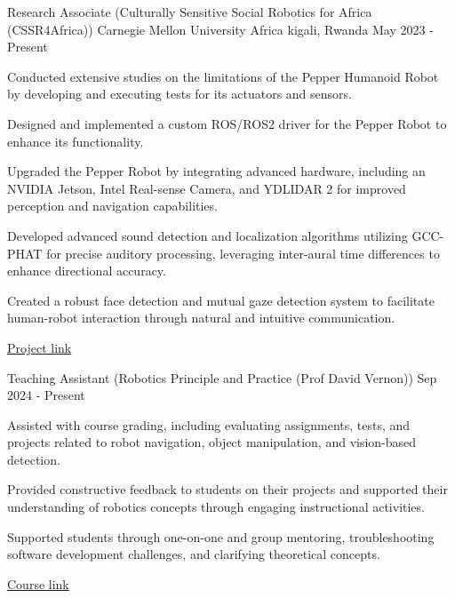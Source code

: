 
\begin{cventries}

  \cvExperience
    {Research Associate (Culturally Sensitive Social Robotics for Africa (CSSR4Africa))} %
    {Carnegie Mellon University Africa} %
    {kigali, Rwanda} %
    {May 2023 - Present} %
    {
      \begin{cvitems} %
        \item {Conducted extensive studies on the limitations of the Pepper Humanoid Robot by developing and executing tests for its actuators and sensors.}
        \item {Designed and implemented a custom ROS/ROS2 driver for the Pepper Robot to enhance its functionality.}
        \item {Upgraded the Pepper Robot by integrating advanced hardware, including an NVIDIA Jetson, Intel Real-sense Camera, and YDLIDAR 2 for improved perception and navigation capabilities.}
        \item {Developed advanced sound detection and localization algorithms utilizing GCC-PHAT for precise auditory processing, leveraging inter-aural time differences to enhance directional accuracy.}
        \item {Created a robust face detection and mutual gaze detection system to facilitate human-robot interaction through natural and intuitive communication.}
      \end{cvitems}
      }
      {\href{www.cssr4africa.org}{Project link}} %

\cvExperience
  {Teaching Assistant (Robotics Principle and Practice (Prof David Vernon))} %
  {} %
  {} %
  {Sep 2024 - Present} %
  {
    \begin{cvitems} %
      \item {Assisted with course grading, including evaluating assignments, tests, and projects related to robot navigation, object manipulation, and vision-based detection.}
      \item {Provided constructive feedback to students on their projects and supported their understanding of robotics concepts through engaging instructional activities.}
      \item {Supported students through one-on-one and group mentoring, troubleshooting software development challenges, and clarifying theoretical concepts.}
    \end{cvitems}
    }
    {\href{http://www.vernon.eu/RPP.htm}{Course link}} %


\end{cventries}
